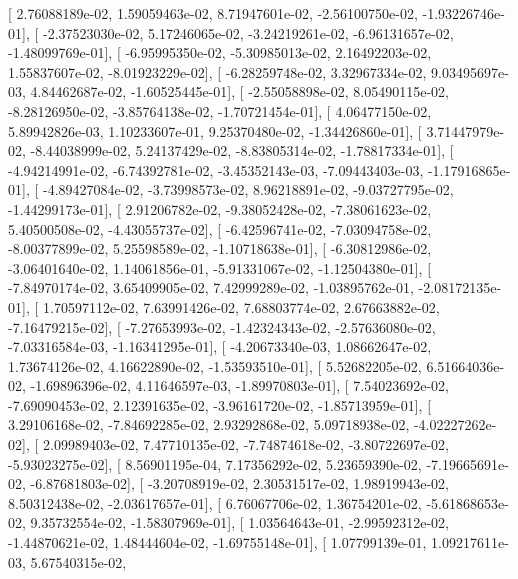 \documentclass{article}
\begin{document}
       [  2.76088189e-02,   1.59059463e-02,   8.71947601e-02,
         -2.56100750e-02,  -1.93226746e-01],
       [ -2.37523030e-02,   5.17246065e-02,  -3.24219261e-02,
         -6.96131657e-02,  -1.48099769e-01],
       [ -6.95995350e-02,  -5.30985013e-02,   2.16492203e-02,
          1.55837607e-02,  -8.01923229e-02],
       [ -6.28259748e-02,   3.32967334e-02,   9.03495697e-03,
          4.84462687e-02,  -1.60525445e-01],
       [ -2.55058898e-02,   8.05490115e-02,  -8.28126950e-02,
         -3.85764138e-02,  -1.70721454e-01],
       [  4.06477150e-02,   5.89942826e-03,   1.10233607e-01,
          9.25370480e-02,  -1.34426860e-01],
       [  3.71447979e-02,  -8.44038999e-02,   5.24137429e-02,
         -8.83805314e-02,  -1.78817334e-01],
       [ -4.94214991e-02,  -6.74392781e-02,  -3.45352143e-03,
         -7.09443403e-03,  -1.17916865e-01],
       [ -4.89427084e-02,  -3.73998573e-02,   8.96218891e-02,
         -9.03727795e-02,  -1.44299173e-01],
       [  2.91206782e-02,  -9.38052428e-02,  -7.38061623e-02,
          5.40500508e-02,  -4.43055737e-02],
       [ -6.42596741e-02,  -7.03094758e-02,  -8.00377899e-02,
          5.25598589e-02,  -1.10718638e-01],
       [ -6.30812986e-02,  -3.06401640e-02,   1.14061856e-01,
         -5.91331067e-02,  -1.12504380e-01],
       [ -7.84970174e-02,   3.65409905e-02,   7.42999289e-02,
         -1.03895762e-01,  -2.08172135e-01],
       [  1.70597112e-02,   7.63991426e-02,   7.68803774e-02,
          2.67663882e-02,  -7.16479215e-02],
       [ -7.27653993e-02,  -1.42324343e-02,  -2.57636080e-02,
         -7.03316584e-03,  -1.16341295e-01],
       [ -4.20673340e-03,   1.08662647e-02,   1.73674126e-02,
          4.16622890e-02,  -1.53593510e-01],
       [  5.52682205e-02,   6.51664036e-02,  -1.69896396e-02,
          4.11646597e-03,  -1.89970803e-01],
       [  7.54023692e-02,  -7.69090453e-02,   2.12391635e-02,
         -3.96161720e-02,  -1.85713959e-01],
       [  3.29106168e-02,  -7.84692285e-02,   2.93292868e-02,
          5.09718938e-02,  -4.02227262e-02],
       [  2.09989403e-02,   7.47710135e-02,  -7.74874618e-02,
         -3.80722697e-02,  -5.93023275e-02],
       [  8.56901195e-04,   7.17356292e-02,   5.23659390e-02,
         -7.19665691e-02,  -6.87681803e-02],
       [ -3.20708919e-02,   2.30531517e-02,   1.98919943e-02,
          8.50312438e-02,  -2.03617657e-01],
       [  6.76067706e-02,   1.36754201e-02,  -5.61868653e-02,
          9.35732554e-02,  -1.58307969e-01],
       [  1.03564643e-01,  -2.99592312e-02,  -1.44870621e-02,
          1.48444604e-02,  -1.69755148e-01],
       [  1.07799139e-01,   1.09217611e-03,   5.67540315e-02,
\end{document}
